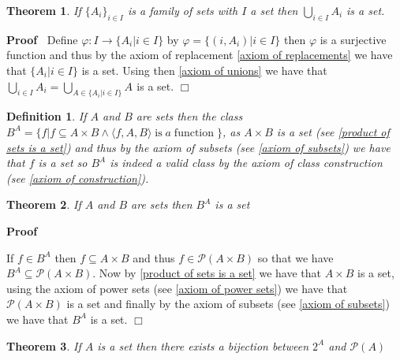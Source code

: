 \documentclass{book}
\newcommand{\nobracket}{}
\newcommand{\tmop}[1]{\ensuremath{\operatorname{#1}}}
\newenvironment{proof}{\noindent\textbf{Proof\ }}{\hspace*{\fill}$\Box$\medskip}
\newtheorem{definition}{Definition}
{\theorembodyfont{\rmfamily}\newtheorem{example}{Example}}
\newtheorem{theorem}{Theorem}
\begin{document}
{{\begin{theorem}
  \label{union of a family of sets is a set}If $\{ A_i \}_{i \in I}$ is a
  family of sets with $I$ a set then $\bigcup_{i \in I} A_i$ is a set. 
\end{theorem}

\begin{proof}
  Define $\varphi : I \rightarrow \{ A_i | i \in I \nobracket \}$ by $\varphi
  = \{ (i, A_i) | i \in I \nobracket \}$ then $\varphi$ is a surjective
  function and thus by the axiom of replacement \ref{axiom of replacements} we
  have that $\{ A_i | i \in I \nobracket \}$ is a set. Using then \ref{axiom
  of unions} we have that $\bigcup_{i \in I} A_i = \bigcup_{A \in \{ A_i | i
  \in I \nobracket \}} A_{}$ is a set.
\end{proof}

\begin{definition}
  \label{function space}{}If $A$ and $B$ are sets then the class
  $B^A = \{ f|f \subseteq A \times B \wedge \langle f, A, B \rangle \tmop{is}
  a \tmop{function} \}$, as $A \times B$ is a set (see \ref{product of sets is
  a set}) and thus by the axiom of subsets (see \ref{axiom of subsets}) we
  have that $f$ is a set so $B^A$ is indeed a valid class by the axiom of
  class construction (see \ref{axiom of construction}).
\end{definition}

\begin{theorem}
  \label{B^A is a set if B and A are sets}If $A$ and $B$ are sets then $B^A$
  is a set
\end{theorem}

\begin{proof}
  \
  
  If $f \in B^A$ then $f \subseteq A \times B$ and thus $f \in \mathcal{P} (A
  \times B)$ so that we have $B^A \subseteq \mathcal{P} (A \times B)$. Now by
  \ref{product of sets is a set} we have that $A \times B$ is a set, using the
  axiom of power sets (see \ref{axiom of power sets}) we have that
  $\mathcal{P} (A \times B)$ is a set and finally by the axiom of subsets (see
  \ref{axiom of subsets}) we have that $B^A$ is a set.
\end{proof}

\begin{theorem}
  \label{P(A) and 2^A are bijective}If $A$ is a set then there exists a
  bijection between $2^A$ and $\mathcal{P} (A)$
\end{theorem}

}}
\end{document}
